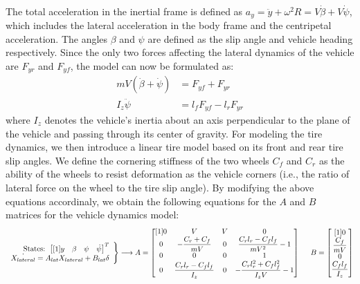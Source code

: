 \paragraph{}
The total acceleration in the inertial frame is defined as $a_y = \ddot{y}+\omega^2R=V\dot{\beta}+V\dot{\psi}$, which includes the lateral acceleration in the body frame and the centripetal acceleration. The angles $\beta$ and $\psi$ are defined as the slip angle and vehicle heading respectively. Since the only two forces affecting the lateral dynamics of the vehicle are $F_{yr}$ and $F_{yf}$, the model can now be formulated as:
\begin{align*}
    mV(\dot{\beta}+\dot{\psi})&=F_{yf}+F_{yr}\\
    I_z\ddot{\psi}&=l_fF_{yf}-l_rF_{yr}
\end{align*}
where $I_z$ denotes the vehicle's inertia about an axis perpendicular to the plane of the vehicle and passing through its center of gravity. For modeling the tire dynamics, we then introduce a linear tire model based on its front and rear tire slip angles. We define the cornering stiffness of the two wheels $C_f$ and $C_r$ as the ability of the wheels to resist deformation as the vehicle corners (i.e., the ratio of lateral force on the wheel to the tire slip angle). By modifying the above equations accordinaly, we obtain the following equations for the $A$ and $B$ matrices for the vehicle dynamics model:
$$\left.\begin{array}{r}
    \text{States: } \begin{bmatrix}[1] y & \beta & \psi & \dot{\psi}\end{bmatrix}^T\\
    \dot{X_{lateral}}=A_{lat}X_{lateral} + B_{lat}\delta 
\end{array}\right\rbrace\longrightarrow
A = \begin{bmatrix}[1]
    0 & V & V & 0\\
    0 & -\dfrac{C_r + C_f}{mV} & 0 & \dfrac{C_rl_r - C_fl_f}{mV^2} - 1\\
    0 & 0 & 0 & 1\\
    0 & \dfrac{C_rl_r - C_fl_f}{I_z} & 0 & -\dfrac{C_rl_r^2 + C_fl_f^2}{I_zV} - 1
\end{bmatrix}\hspace{5mm}
B = \begin{bmatrix}[1]
    0\\ \dfrac{C_f}{mV}\\ 0\\ \dfrac{C_fl_f}{I_z}
\end{bmatrix}$$

